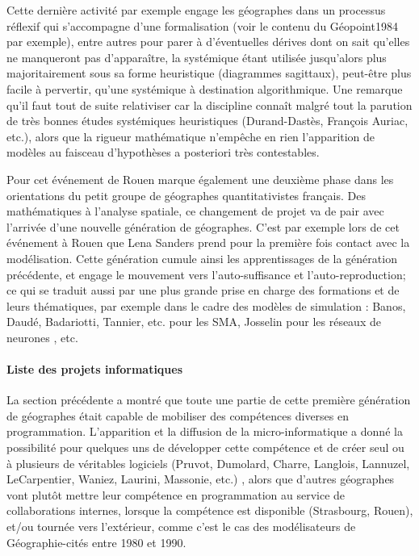 Cette dernière activité par exemple engage les géographes dans un processus réflexif qui s'accompagne d'une formalisation (voir le contenu du Géopoint1984 par exemple), entre autres pour parer à d'éventuelles dérives dont on sait qu'elles ne manqueront pas d'apparaître, la systémique étant utilisée jusqu'alors plus majoritairement sous sa forme heuristique (diagrammes sagittaux), peut-être plus facile à pervertir, qu'une systémique à destination algorithmique. Une remarque qu'il faut tout de suite relativiser car la discipline connaît malgré tout la parution de très bonnes études systémiques heuristiques (Durand-Dastès, François Auriac, etc.), alors que la rigueur mathématique n'empêche en rien l'apparition de modèles au faisceau d'hypothèses a posteriori très contestables. \autocite{Orain2001} %

Pour \textcite[320-321]{Cuyala2014} cet événement de Rouen marque également une deuxième phase dans les orientations du petit groupe de géographes quantitativistes français. Des mathématiques à l'analyse spatiale, ce changement de projet va de pair avec l'arrivée d'une nouvelle génération de géographes. C'est par exemple lors de cet événement à Rouen que Lena Sanders prend pour la première fois contact avec la modélisation. Cette génération cumule ainsi les apprentissages de la génération précédente, et engage le mouvement vers l'auto-suffisance et l'auto-reproduction; ce qui se traduit aussi par une plus grande prise en charge des formations et de leurs thématiques, par exemple dans le cadre des modèles de simulation : Banos, Daudé, Badariotti, Tannier, etc. pour les SMA, Josselin pour les réseaux de neurones \autocite{Dumolard1994}, etc.

\paragraph{Liste des projets informatiques}

La section précédente a montré que toute une partie de cette première génération de géographes était capable de mobiliser des compétences diverses en programmation. L'apparition et la diffusion de la micro-informatique a donné la possibilité pour quelques uns de développer cette compétence et de créer seul ou à plusieurs de véritables logiciels (Pruvot, Dumolard, Charre, Langlois, Lannuzel, LeCarpentier, Waniez, Laurini, Massonie, etc.) \autocites[191]{Mathieu2014, Massonie1986, Charre1989}, alors que d'autres géographes vont plutôt mettre leur compétence en programmation au service de collaborations internes, lorsque la compétence est disponible (Strasbourg, Rouen), et/ou tournée vers l'extérieur, comme c'est le cas des modélisateurs de Géographie-cités entre 1980 et 1990.

